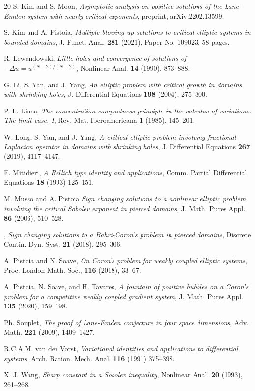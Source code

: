 \documentclass[reqno]{amsart}
\theoremstyle{remark}
\renewcommand{\(}{\left(}
\renewcommand{\)}{\right)}
\numberwithin{equation}{section}
\begin{document}
\begin{thebibliography}{20}
S. Kim and S. Moon, \textit{Asymptotic analysis on positive solutions of the Lane-Emden system with nearly critical exponents}, preprint, arXiv:2202.13599.

S. Kim and A. Pistoia, \textit{Multiple blowing-up solutions to critical elliptic systems in bounded domains}, J. Funct. Anal. \textbf{281} (2021), Paper No. 109023, 58 pages.

R. Lewandowski, \textit{Little holes and convergence of solutions of $-\Delta u = u^{(N+2)/(N-2)}$}, Nonlinear Anal. \textbf{14} (1990), 873--888.

G. Li, S. Yan, and J. Yang, \textit{An elliptic problem with critical growth in domains with shrinking holes}, J. Differential Equations \textbf{198} (2004), 275--300.

P.-L. Lions, \textit{The concentration-compactness principle in the calculus of variations. The limit case. I}, Rev. Mat. Iberoamericana \textbf{1} (1985), 145--201.

W. Long, S. Yan, and J. Yang, \textit{A critical elliptic problem involving fractional Laplacian operator in domains with shrinking holes}, J. Differential Equations \textbf{267} (2019), 4117--4147.

E. Mitidieri, \textit{A Rellich type identity and applications}, Comm. Partial Differential Equations \textbf{18} (1993) 125--151.

M. Musso and A. Pistoia \textit{Sign changing solutions to a nonlinear elliptic problem involving the critical Sobolev exponent in pierced domains}, J. Math. Pures Appl. \textbf{86} (2006), 510--528.

\bysame, \textit{Sign changing solutions to a Bahri-Coron's problem in pierced domains}, Discrete Contin. Dyn. Syst. \textbf{21} (2008), 295--306.

A. Pistoia and N. Soave, \textit{On Coron’s problem for weakly coupled elliptic systems}, Proc. London Math. Soc., \textbf{116} (2018), 33--67.

A. Pistoia, N. Soave, and H. Tavares, \textit{A fountain of positive bubbles on a Coron's problem for a competitive weakly coupled gradient system}, J. Math. Pures Appl. \textbf{135} (2020), 159--198.

Ph. Souplet, \textit{The proof of Lane-Emden conjecture in four space dimensions}, Adv. Math. \textbf{221} (2009), 1409--1427.

R.C.A.M. van der Vorst, \textit{Variational identities and applications to differential systems}, Arch. Ration. Mech. Anal. \textbf{116} (1991) 375--398.

X. J. Wang, \textit{Sharp constant in a Sobolev inequality}, Nonlinear Anal. \textbf{20} (1993), 261--268.
\end{thebibliography}
\end{document}

